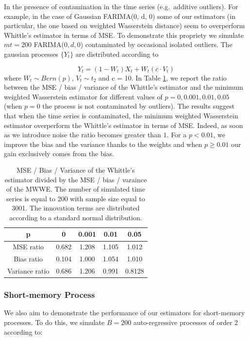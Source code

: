 \documentclass[
  11pt,
]{article}
\begin{document}
In the presence of contamination in the time series (e.g.~additive
outliers). For example, in the case of Gaussian FARIMA(0, d, 0) some of
our estimators (in particular, the one based on weighted Wasserstein
distance) seem to overperform Whittle's estimator in terms of MSE. To
demonstrate this propriety we simulate \(mt = 200\) FARIMA(\(0,d,0\))
contaminated by occasional isolated outliers. The gaussian processes
\(\{Y_t\}\) are distributed according to

\[Y_{t}=\left(1-W_{t}\right) X_{t}+W_{t}\left(c \cdot V_{t}\right)\]
where \(W_t \sim Bern(p)\), \(V_t \sim t_2\) and c = 10. In Table
\ref{tab:outliers}, we report the ratio between the MSE / bias /
variance of the Whittle's estimator and the minimum weighted Wasserstein
estimator for different values of \(p = 0, 0.001, 0.01, 0.05\) (when
\(p = 0\) the process is not contaminated by outliers). The results
suggest that when the time series is contaminated, the minimum weighted
Wasserstein estimator overperform the Whittle's estimator in terms of
MSE. Indeed, as soon as we introduce noise the ratio becomes greater
than \(1\). For a \(p < 0.01\), we improve the bias and the variance
thanks to the weights and when \(p \geq 0.01\) our gain exclusively
comes from the bias.

\begin{table}[h]
\centering
\begin{tabular}{|c|c|c|c|c|}
\hline
p  &  0  & 0.001   & 0.01    & 0.05 \\
\hline
MSE ratio  & 0.682 & 1.208 & 1.105 & 1.012 \\
\hline
Bias ratio & 0.104 & 1.000 & 1.054 & 1.010\\
\hline 
Variance ratio & 0.686 & 1.206 & 0.991 & 0.8128 \\ 
\hline
\end{tabular}
\caption{MSE / Bias / Variance of the Whittle's estimator divided by the MSE / bias / varaince of the MWWE. The number of simulated time series is equal to 200 with sample size equal to 3001. The innovation terms are distributed according to a standard normal distribution.}
\label{tab:outliers}
\end{table}

\hypertarget{short-memory-process}{%
\subsubsection{Short-memory Process}\label{short-memory-process}}

We also aim to demonstrate the performance of our estimators for
short-memory processes. To do this, we simulate \(B = 200\)
auto-regressive processes of order 2 according to:
\end{document}
